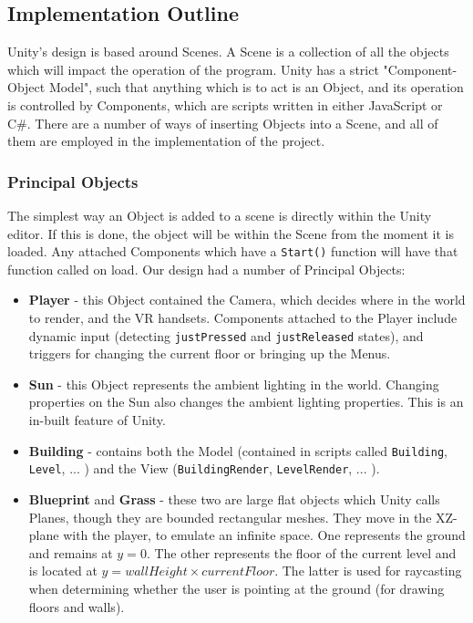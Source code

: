 \subsection{Implementation Outline}

Unity's design is based around Scenes. A Scene is a collection of all the objects which will impact the operation of the program. Unity has a strict "Component-Object Model", such that anything which is to act is an Object, and its operation is controlled by Components, which are scripts written in either JavaScript or C\#. There are a number of ways of inserting Objects into a Scene, and all of them are employed in the implementation of the project.

\subsubsection*{Principal Objects}
The simplest way an Object is added to a scene is directly within the Unity editor. If this is done, the object will be within the Scene from the moment it is loaded. Any attached Components which have a \verb|Start()| function will have that function called on load. Our design had a number of Principal Objects:

\begin{itemize}
    \item \textbf{Player} - this Object contained the Camera, which decides where in the world to render, and the VR handsets. Components attached to the Player include dynamic input (detecting \verb|justPressed| and \verb|justReleased| states), and triggers for changing the current floor or bringing up the Menus.
    \item \textbf{Sun} - this Object represents the ambient lighting in the world. Changing properties on the Sun also changes the ambient lighting properties. This is an in-built feature of Unity.
    \item \textbf{Building} - contains both the Model (contained in scripts called \verb|Building|, \verb|Level|, ... ) and the View (\verb|BuildingRender|, \verb|LevelRender|, ... ). 
    \item \textbf{Blueprint} and \textbf{Grass} - these two are large flat objects which Unity calls Planes, though they are bounded rectangular meshes. They move in the XZ-plane with the player, to emulate an infinite space. One represents the ground and remains at $y=0$. The other represents the floor of the current level and is located at $y=wallHeight \times currentFloor$. The latter is used for raycasting when determining whether the user is pointing at the ground (for drawing floors and walls).
\end{itemize}

